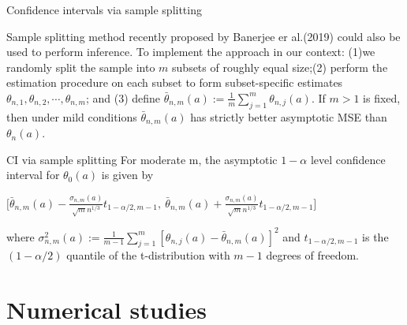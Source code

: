 \documentclass{beamer}
\begin{document}


\begin{frame}{Confidence intervals via sample splitting}

	Sample splitting method recently proposed by Banerjee er al.(2019) could also be used to perform inference. To implement the approach in our context: (1)we randomly split the sample into $m$ subsets of roughly equal size;(2) perform the estimation procedure on each subset to form subset-specific estimates $\theta_{n,1},\theta_{n,2},\cdots,\theta_{n,m}$; and (3) define $\bar{\theta}_{n,m}(a):=\frac{1}{m}\sum^m_{j=1}\theta_{n,j}(a)$.
	 If $m>1$ is fixed, then under mild conditions $\bar{\theta}_{n,m}(a)$ has strictly better asymptotic MSE than $\theta_n(a)$.

\begin{block}{CI via sample splitting}
	For moderate m, the asymptotic $1-\alpha$ level confidence interval for $\theta_0(a)$ is given by
	\begin{center}
	$\Bigg[ \bar{\theta}_{n,m}(a)-\frac{\sigma_{n,m}(a)}{\sqrt{m}n^{1/3}}t_{1-\alpha/2,m-1}, \ \bar{\theta}_{n,m}(a)+\frac{\sigma_{n,m}(a)}{\sqrt{m}n^{1/3}}t_{1-\alpha/2,m-1} \Bigg]$
	\end{center}
	where $\sigma^2_{n,m}(a):=\frac{1}{m-1} \sum^m_{j=1}[\theta_{n,j}(a)-\bar{\theta}_{n,m}(a)]^2$ and $t_{1-\alpha/2,m-1}$ is the $(1-\alpha/2)$ quantile of the t-distribution with $m-1$ degrees of freedom.
\end{block}

\end{frame}

\section{Numerical studies}

\end{document}
